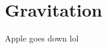 \documentclass{scrartcl}
\begin{document}
    \section{Gravitation}
    Apple goes down lol
\end{document}
